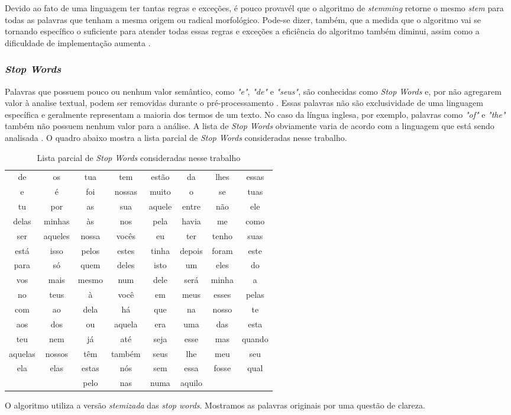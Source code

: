Devido ao fato de uma linguagem ter tantas regras e exceções, é pouco provavél que o algoritmo de \textit{stemming} retorne o mesmo \textit{stem} para todas as palavras que tenham a mesma origem ou radical morfológico. Pode-se dizer, também, que a medida que o algoritmo vai se tornando específico o suficiente para atender todas essas regras e exceções a eficiência do algoritmo também diminui, assim como a dificuldade de implementação aumenta \cite{imamura2001}.

\subsubsection{\textit{Stop Words}}
\label{ssub:stop_words}

Palavras que possuem pouco ou nenhum valor semântico, como \textit{"e"}, \textit{"de"} e \textit{"seus"}, são conhecidas como \textit{Stop Words} e, por não agregarem valor à analise textual, podem ser removidas durante o pré-processamento \cite{rajaraman2011}. Essas palavras não são exclusividade de uma linguagem específica e geralmente representam a maioria dos termos de um texto. No caso da língua inglesa, por exemplo, palavras como \textit{"of"} e \textit{"the"} também não possuem nenhum valor para a análise. A lista de \textit{Stop Words} obviamente varia de acordo com a linguagem que está sendo analisada \cite{lopes2015}. O quadro abaixo mostra a lista parcial de \textit{Stop Words} consideradas nesse trabalho.

\begin{table}[h]
\centering
\begin{tabular}{cccccccc}
\cline{1-8}
de & os & tua & tem & estão & da & lhes & essas \\
e & é & foi & nossas & muito & o & se & tuas \\
tu & por & as & sua & aquele & entre & não & ele \\
delas & minhas & às & nos & pela & havia & me & como \\
ser & aqueles & nossa & vocês & eu & ter & tenho & suas \\
está & isso & pelos & estes & tinha & depois & foram & este \\
para & só & quem & deles & isto & um & eles & do \\
vos & mais & mesmo & num & dele & será & minha & a \\
no & teus & à & você & em & meus & esses & pelas \\
com & ao & dela & há & que & na & nosso & te \\
aos & dos & ou & aquela & era & uma & das & esta \\
teu & nem & já & até & seja & esse & mas & quando \\
aquelas & nossos & têm & também & seus & lhe & meu & seu \\
ela & elas & estas & nós & sem & essa & fosse & qual \\
& & pelo & nas & numa & aquilo & & \\
\cline{1-8}
\end{tabular}
\caption{Lista parcial de \textit{Stop Words} consideradas nesse trabalho}
\label{exemplos-stop-words}
\end{table}

O algoritmo utiliza a versão \textit{stemizada} das \textit{stop words}. Mostramos as palavras originais por uma questão de clareza.
